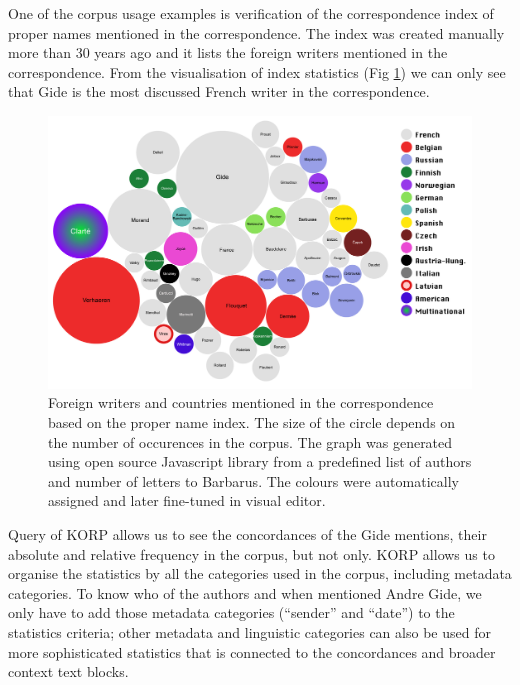 \documentclass[runningheads]{llncs}
\begin{document}
One of the corpus usage examples is verification of the correspondence index of proper names mentioned in the correspondence. The index was created manually more than 30 years ago and it lists the foreign writers mentioned in the correspondence. From the visualisation of index statistics (Fig \ref{fig2}) we can only see that Gide is the most discussed French writer in the correspondence.

\begin{figure}
  \includegraphics[width=\textwidth]{mummud}
  \caption{Foreign writers and countries mentioned in the correspondence based on the proper name index.  The size of the circle depends on the number of occurences in the corpus. The graph was generated using open source Javascript library from a predefined list of authors and number of letters to Barbarus. The colours were automatically assigned and later fine-tuned in visual editor.}
  \label{fig2}
\end{figure}


Query of KORP allows us to see the concordances of the Gide mentions, their absolute and relative frequency in the corpus, but not only. KORP allows us to organise the statistics by all the categories used in the corpus, including metadata categories. To know who of the authors and when mentioned Andre Gide, we only have to add those metadata categories (``sender'' and ``date'') to the statistics criteria; other metadata and linguistic categories can also be used for more sophisticated statistics that is connected to the concordances and broader context text blocks. 
\end{document}
